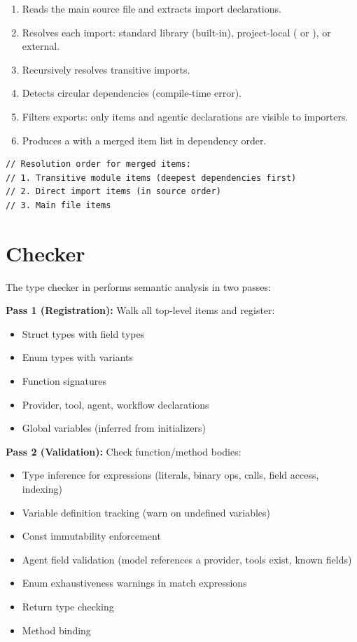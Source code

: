 \begin{enumerate}
    \item Reads the main source file and extracts import declarations.
    \item Resolves each import: standard library (built-in), project-local ( or ), or external.
    \item Recursively resolves transitive imports.
    \item Detects circular dependencies (compile-time error).
    \item Filters exports: only  items and agentic declarations are visible to importers.
    \item Produces a  with a merged item list in dependency order.
\end{enumerate}

\begin{lstlisting}[language={},numbers=none]
// Resolution order for merged items:
// 1. Transitive module items (deepest dependencies first)
// 2. Direct import items (in source order)
// 3. Main file items
\end{lstlisting}

\section{Checker}

The type checker in  performs semantic analysis in two passes:

\textbf{Pass 1 (Registration):} Walk all top-level items and register:
\begin{itemize}
    \item Struct types with field types
    \item Enum types with variants
    \item Function signatures
    \item Provider, tool, agent, workflow declarations
    \item Global variables (inferred from initializers)
\end{itemize}

\textbf{Pass 2 (Validation):} Check function/method bodies:
\begin{itemize}
    \item Type inference for expressions (literals, binary ops, calls, field access, indexing)
    \item Variable definition tracking (warn on undefined variables)
    \item Const immutability enforcement
    \item Agent field validation (model references a provider, tools exist, known fields)
    \item Enum exhaustiveness warnings in match expressions
    \item Return type checking
    \item Method  binding
\end{itemize}

